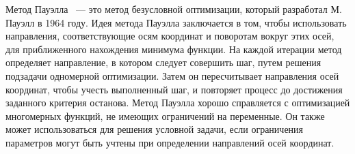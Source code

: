 Метод Пауэлла~\cite{powell1964efficient} --- это метод безусловной оптимизации, который разработал М. Пауэлл в 1964 году.
Идея метода Пауэлла заключается в том, чтобы использовать направления, соответствующие осям координат и поворотам вокруг этих осей, для приближенного нахождения минимума функции.
На каждой итерации метод определяет направление, в котором следует совершить шаг, путем решения подзадачи одномерной оптимизации. 
Затем он пересчитывает направления осей координат, чтобы учесть выполненный шаг, и повторяет процесс до достижения заданного критерия останова.
Метод Пауэлла хорошо справляется с оптимизацией многомерных функций, не имеющих ограничений на переменные.
Он также может использоваться для решения условной задачи, если ограничения параметров могут быть учтены при определении направлений осей координат.

